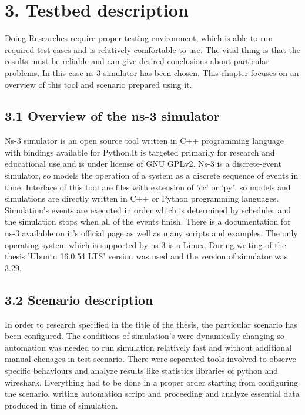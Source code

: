 \section{3. Testbed description}
\textnormal{
	\hspace*{1cm}Doing Researches require proper testing environment, which is able to run required test-cases and is relatively comfortable to use.
	The vital thing is that the results must be reliable and can give desired conclusions about particular problems. In this case ns-3 simulator has been chosen. This chapter focuses on an overview of this tool and scenario prepared using it.}
\subsection{\hspace*{1cm} 3.1 Overview of the ns-3 simulator}
\textnormal{
	\hspace*{1cm}Ns-3 simulator is an open source tool written in C++ programming language with bindings available for Python.It is targeted primarily for research and educational use and is under license of GNU GPLv2. Ns-3 is a discrete-event simulator, so models the operation of a system as a discrete sequence of events in time. Interface of this tool are files with extension of 'cc' or 'py', so models and simulations are directly written in C++ or Python programming languages. Simulation's events are executed in order which is determined by scheduler and the simulation stops when all of the events finish. There is a documentation for ns-3 available on it's official page as well as many scripts and examples. The only operating system which is supported by ns-3 is a Linux. During writing of the thesis 'Ubuntu 16.0.54 LTS' version was used and the version of simulator was 3.29.}
\subsection{\hspace*{1cm}3.2 Scenario description}
	\textnormal{\hspace*{2cm}In order to research specified in the title of the thesis, the particular scenario has been configured. The conditions of simulation's were dynamically changing so automation was needed to run simulation relatively fast and without additional manual chcnages in test scenario. There were separated tools involved to observe specific behaviours and analyze results like statistics libraries of python and wireshark. Everything had to be done in a proper order starting from configuring the scenario, writing automation script and proceeding and analyze essential data produced in time of simulation.}

